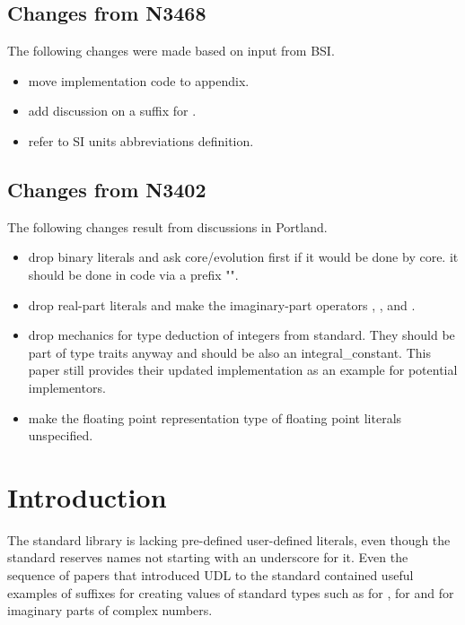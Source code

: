 \documentclass[ebook,11pt,article]{memoir}
\begin{document}
\section{Changes from N3468}
The following changes were made based on input from BSI.
\begin{itemize}
\item move implementation code to appendix.
\item add discussion on a suffix for .
\item refer to SI units abbreviations definition.
\end{itemize}

\section{Changes from N3402}
The following changes result from discussions in Portland.
\begin{itemize}
\item drop binary literals and ask core/evolution first if it would be done by core. it should be done in code via a prefix "".
\item drop real-part  literals  and make the imaginary-part operators , , and .
\item drop mechanics for type deduction of integers from standard. They should be part of type traits anyway and should be also an integral\_constant. This paper still provides their updated implementation as an example for potential implementors.
\item make the floating point representation type of  floating point literals unspecified.
\end{itemize}


\chapter{Introduction}
The standard library is lacking pre-defined user-defined literals, even though the standard reserves names not starting with an underscore for it. Even the sequence of papers that introduced UDL to the standard contained useful examples of suffixes for creating values of standard types such as  for ,  for  and  for imaginary parts of complex numbers.
\end{document}
